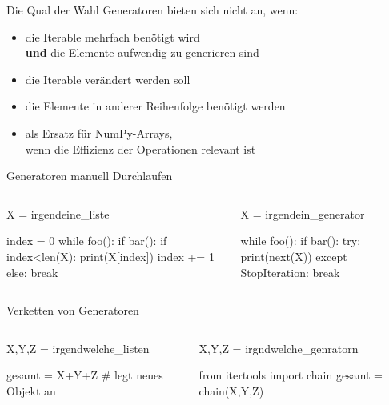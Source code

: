 \documentclass[xcolor=dvipsnames, aspectratio=169, 14pt]{beamer}
\begin{document}
\begin{frame}{Die Qual der Wahl}
	Generatoren bieten sich nicht an, wenn:
	\vfill
	\begin{itemize}
		\setlength{\itemsep}{\fill}
		\item die Iterable mehrfach benötigt wird\\ \textbf{und} die Elemente aufwendig zu generieren sind
		\item die Iterable verändert werden soll
		\item die Elemente in anderer Reihenfolge benötigt werden
		\item als Ersatz für NumPy-Arrays,\\ wenn die Effizienz der Operationen relevant ist
	\end{itemize}
\end{frame}

\begin{frame}[fragile]{Generatoren manuell Durchlaufen}
	\begin{columns}%
	\vspace{-\baselineskip}
	\begin{python3code}
	X = irgendeine_liste
	
	index = 0
	while foo():
		if bar():
			if index<len(X):
				print(X[index])
				index += 1
			else:
				break
	\end{python3code}
	
	\vspace{-\baselineskip}
	\begin{python3code}
	X = irgendein_generator
	
	while foo():
		if bar():
			try:
				print(next(X))
			except StopIteration:
				break
	\end{python3code}
	\end{columns}
\end{frame}

\begin{frame}[fragile]{Verketten von Generatoren}
	\begin{columns}%
	\column{0.5\linewidth}
	\vspace{-\baselineskip}
	\begin{python3code}
	X,Y,Z = irgendwelche_listen
	
	gesamt = X+Y+Z
	# legt neues Objekt an
	\end{python3code}
	
	\column{0.5\linewidth}
	\vspace{-\baselineskip}
	\begin{python3code}
	X,Y,Z = irgndwelche_genratorn
	
	from itertools import chain
	gesamt = chain(X,Y,Z)
	\end{python3code}
	\end{columns}
\end{frame}
\end{document}
